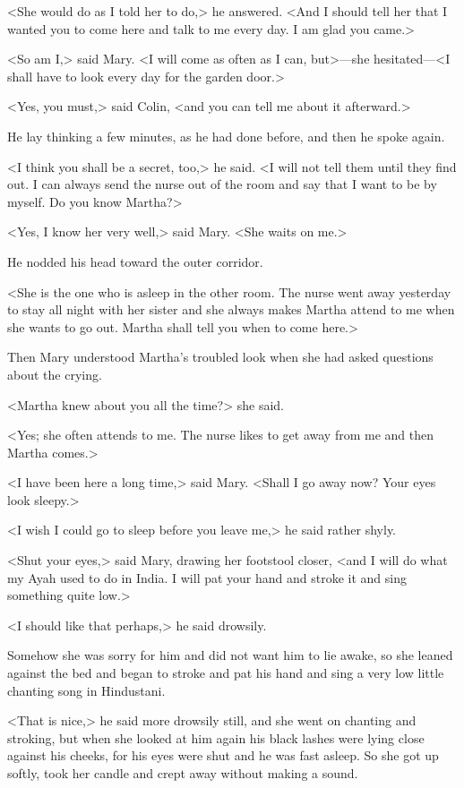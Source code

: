 <She would do as I told her to do,> he answered. <And I should tell her that I wanted you to come here and talk to me every day. I am glad you came.>

<So am I,> said Mary. <I will come as often as I can, but>—she hesitated—<I shall have to look every day for the garden door.>

<Yes, you must,> said Colin, <and you can tell me about it afterward.>

He lay thinking a few minutes, as he had done before, and then he spoke again.

<I think you shall be a secret, too,> he said. <I will not tell them until they find out. I can always send the nurse out of the room and say that I want to be by myself. Do you know Martha?>

<Yes, I know her very well,> said Mary. <She waits on me.>

He nodded his head toward the outer corridor.

<She is the one who is asleep in the other room. The nurse went away yesterday to stay all night with her sister and she always makes Martha attend to me when she wants to go out. Martha shall tell you when to come here.>

Then Mary understood Martha's troubled look when she had asked questions about the crying.

<Martha knew about you all the time?> she said.

<Yes; she often attends to me. The nurse likes to get away from me and then Martha comes.>

<I have been here a long time,> said Mary. <Shall I go away now? Your eyes look sleepy.>

<I wish I could go to sleep before you leave me,> he said rather shyly.

<Shut your eyes,> said Mary, drawing her footstool closer, <and I will do what my Ayah used to do in India. I will pat your hand and stroke it and sing something quite low.>

<I should like that perhaps,> he said drowsily.

Somehow she was sorry for him and did not want him to lie awake, so she leaned against the bed and began to stroke and pat his hand and sing a very low little chanting song in Hindustani.

<That is nice,> he said more drowsily still, and she went on chanting and stroking, but when she looked at him again his black lashes were lying close against his cheeks, for his eyes were shut and he was fast asleep. So she got up softly, took her candle and crept away without making a sound.
